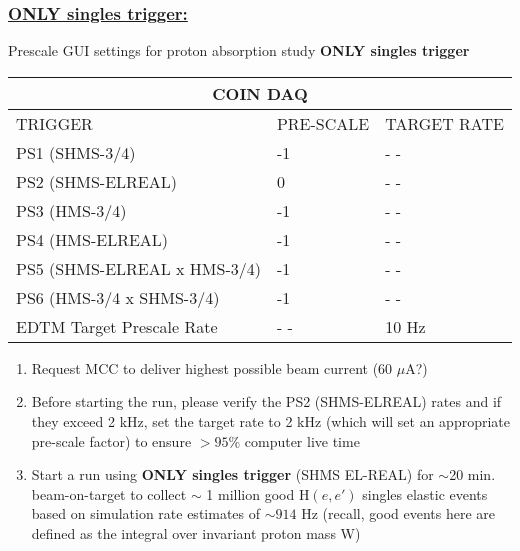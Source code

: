 \documentclass{article}
\begin{document}
\subsubsection*{\underline{ONLY singles trigger:}}
  \begin{center}
    Prescale GUI settings for proton absorption study \textbf{ONLY singles trigger}
    \begin{tabular}{ |p{6cm}| |p{3cm}| |p{3cm}| }
    \hline
    \multicolumn{3}{|c|}{COIN DAQ} \\
    \hline
    TRIGGER & PRE-SCALE & TARGET RATE\\
    \hline
    PS1 (SHMS-3/4)    & -1  & - - \\
    PS2 (SHMS-ELREAL) &  0  & - - \\
    PS3 (HMS-3/4)     & -1  & - -\\
    PS4 (HMS-ELREAL)  & -1  & - - \\
    PS5 (SHMS-ELREAL x HMS-3/4)  & -1 & - -  \\
    PS6 (HMS-3/4 x SHMS-3/4)     & -1 & - -  \\
    \hline
    EDTM Target Prescale Rate & - - & 10 Hz \\
    \hline
    \end{tabular}
    \end{center}
\begin{enumerate}
    \item Request MCC to deliver highest possible beam current (60 $\mu$A?)
    \item Before starting the run, please verify the PS2 (SHMS-ELREAL) rates and if they exceed 2 kHz, set the target rate to 2 kHz (which will set an appropriate pre-scale factor) to ensure $>95\%$ computer live time
    \item Start a run using \textbf{ONLY singles trigger} (SHMS EL-REAL) for $\sim$20 min. beam-on-target to collect $\sim$ 1 million good H$(e,e')$ singles elastic events based on simulation rate estimates of $\sim914$ Hz (recall, good events here are defined as the integral over invariant proton mass W)
\end{enumerate}
\end{document}
